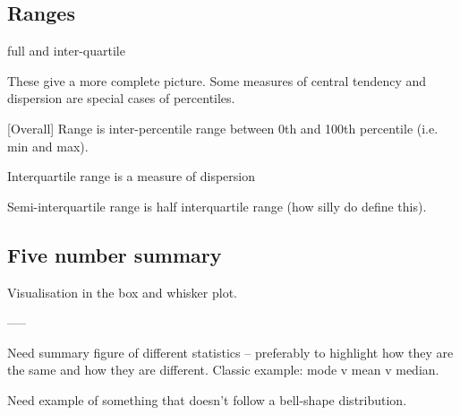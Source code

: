 \documentclass[a4paper,11pt]{report}
\begin{document}
\subsection{Ranges}
 full and inter-quartile

These give a more complete picture. Some measures of central tendency
and dispersion are special cases of percentiles.

[Overall] Range is inter-percentile range between 0th and 100th
percentile (i.e. min and max).

Interquartile range is a measure of dispersion

Semi-interquartile range is half interquartile range (how silly do
define this).

\subsection{Five number summary}

Visualisation in the box and whisker plot.

-----

Need summary figure of different statistics -- preferably to highlight
how they are the same and how they are different. Classic example:
mode v mean v median.

Need example of something that doesn't follow a bell-shape distribution.
\end{document}
